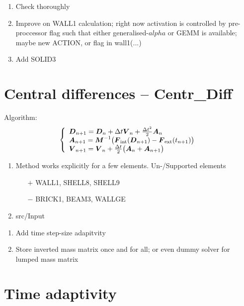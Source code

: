 \begin{enumerate}
\item Check thoroughly
\item Improve on WALL1 calculation; right now activation is controlled by
  pre-proccessor flag such that either generalised-$alpha$ or GEMM is
  available; maybe new ACTION, or flag in wall1(...)
\item Add SOLID3
\end{enumerate}

\section{Central differences -- \ccarat Centr\_Diff}
Algorithm:
\begin{gather*}
  \left\{\begin{array}{l}
     \boldsymbol{D}_{n+1} = \boldsymbol{D}_n + \Delta t \boldsymbol{V}_n + \frac{\Delta t^2}{2} \boldsymbol{A}_n
  \\
     \boldsymbol{A}_{n+1} = \boldsymbol{M}^{-1} \big( 
                     \boldsymbol{F}_{\text{int}}(\boldsymbol{D}_{n+1}) 
                     - \boldsymbol{F}_{\text{ext}}(t_{n+1})
                     \big)
  \\
     \boldsymbol{V}_{n+1} 
               = \boldsymbol{V}_n + \frac{\Delta t}{2} \big( 
               \boldsymbol{A}_n + \boldsymbol{A}_{n+1} \big)
  \end{array}\right.
\end{gather*}
\begin{enumerate}
\item Method works explicitly for a few elements. Un-/Supported elements
  \begin{itemize}
  \item[$+$] WALL1, SHELL8, SHELL9
  \item[$-$] BRICK1, BEAM3, WALLGE
  \end{itemize}
\item src/Input 
\end{enumerate}

\begin{enumerate}
\item Add time step-size adapitvity
\item Store inverted mass matrix once and for all; or even dummy solver for
  lumped mass matrix
\end{enumerate}

\section{Time adaptivity}

